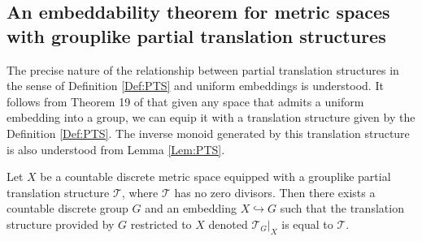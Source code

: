 \begin{corollary}
\subsection{An embeddability theorem for metric spaces with grouplike partial translation structures}

The precise nature of the relationship between partial translation structures in the sense of Definition \ref{Def:PTS} and uniform embeddings is understood. It follows from Theorem 19 of \cite{MR2363428} that given any space that admits a uniform embedding into a group, we can equip it with a translation structure given by the Definition \ref{Def:PTS}. The inverse monoid generated by this translation structure is also understood from Lemma \ref{Lem:PTS}.

\begin{theorem}\label{thm:T2}
Let $X$ be a countable discrete metric space equipped with a grouplike partial translation structure $\mathcal{T}$, where $\mathcal{T}$ has no zero divisors. Then there exists a countable discrete group $G$ and an embedding $X \hookrightarrow G$ such that the translation structure provided by $G$ restricted to $X$ denoted $\mathcal{T}_{G}|_{X}$ is equal to $\mathcal{T}$.
\end{theorem}


\end{corollary}

